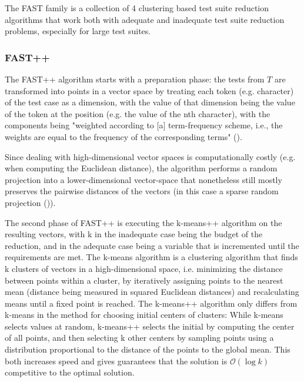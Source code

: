 The FAST family is a collection of 4 clustering based test suite
reduction algorithms that work both with adequate and inadequate test
suite reduction problems, especially for large test suites.

\subsubsection{FAST++}


The FAST++ algorithm starts with a preparation phase: the tests from $T$
are transformed into points in a vector space by treating each token
(e.g. character) of the test case as a dimension, with the value of that
dimension being the value of the token at the position (e.g. the value
of the nth character), with the components being "weighted according to
[a] term-frequency scheme, i.e., the weights are equal to the frequency
of the corresponding terms" (\cite{cruciani2019scalable}).

Since dealing with high-dimensional vector spaces is computationally
costly (e.g. when computing the Euclidean distance), the algorithm
performs a random projection into a lower-dimensional vector-space that
nonetheless still mostly preserves the pairwise distances of the vectors
(in this case a sparse random projection (\cite{achlioptas2003database})).

The second phase of FAST++ is executing the k-means++ algorithm \cite{arthur2006k}
on the resulting vectors, with k in the inadequate case being the
budget of the reduction, and in the adequate case being a variable
that is incremented until the requirements are met. The k-means
algorithm is a clustering algorithm that finds k clusters of vectors in a
high-dimensional space, i.e. minimizing the distance between points within
a cluster, by iteratively assigning points to the nearest mean (distance
being measured in squared Euclidean distances) and recalculating means
until a fixed point is reached. The k-means++ algorithm only differs
from k-means in the method for choosing initial centers of clusters:
While k-means selects values at random, k-means++ selects the initial by
computing the center of all points, and then selecting k other centers by
sampling points using a distribution proportional to the distance of the
points to the global mean. This both increases speed %
and gives guarantees that the solution is $\mathcal{O}(\log k)$ competitive
to the optimal solution. %

